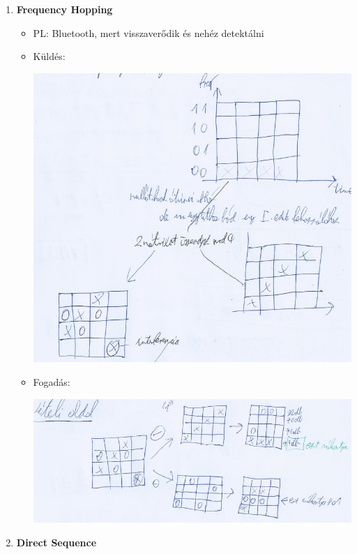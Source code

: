 	\begin{enumerate}
		\item \textbf{Frequency Hopping}

		\begin{itemize}

			\item	PL: Bluetooth, mert visszaverődik és nehéz detektálni

			\item	Küldés:
				\begin{center}
					\includegraphics[scale=0.8]{img/CDMA1}
				\end{center}
			\item	Fogadás:
				\begin{center}
					\includegraphics[scale=0.8]{img/CDMA2}
				\end{center}
		\end{itemize}

		\item \textbf{Direct Sequence}


\end{enumerate}
